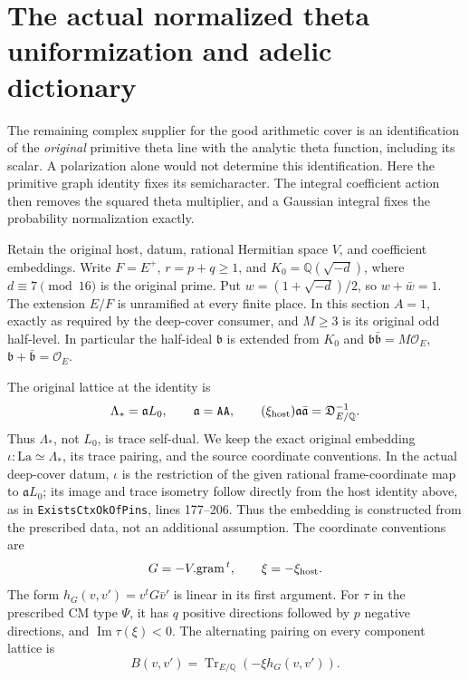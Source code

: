 \section{The actual normalized theta uniformization and adelic dictionary}
\label{sec:actual-normalized-member}

The remaining complex supplier for the good arithmetic cover is an
identification of the \emph{original} primitive theta line with the
analytic theta function, including its scalar.  A polarization alone
would not determine this identification.  Here the primitive graph
identity fixes its semicharacter.  The integral coefficient action
then removes the squared theta multiplier, and a Gaussian integral
fixes the probability normalization exactly.

Retain the original host, datum, rational Hermitian space $V$, and
coefficient embeddings.  Write $F=E^+$, $r=p+q\ge1$, and
$K_0=\mathbb Q(\sqrt{-d})$, where $d\equiv7\pmod {16}$ is the
original prime.  Put $w=(1+\sqrt{-d})/2$, so $w+\bar w=1$.
The extension $E/F$ is unramified at every finite place.  In this
section $A=1$, exactly as required by the deep-cover consumer, and
$M\ge3$ is its original odd half-level.  In particular the half-ideal
$\mathfrak b$ is extended from $K_0$ and
$\mathfrak b\bar{\mathfrak b}=M\mathcal O_E$,
$\mathfrak b+\bar{\mathfrak b}=\mathcal O_E$.

The original lattice at the identity is
\begin{equation}\label{eq:member-original-lattice}
 \Lambda_*=\mathfrak a L_0,\qquad
 \mathfrak a=\texttt{AA},\qquad
 (\xi_{\rm host})\mathfrak a\bar{\mathfrak a}
                       =\mathfrak D_{E/\mathbb Q}^{-1}.
\end{equation}
Thus $\Lambda_*$, not $L_0$, is trace self-dual.  We keep the exact
original embedding $\iota:\mathrm{La}\simeq\Lambda_*$, its trace
pairing, and the source coordinate conventions.  In the actual
deep-cover datum, $\iota$ is the restriction of the given rational
frame-coordinate map to $\mathfrak a L_0$; its image and trace
isometry follow directly from the host identity above, as in
\texttt{ExistsCtxOkOfPins}, lines 177--206.  Thus the embedding is
constructed from the prescribed data, not an additional assumption.
The coordinate conventions are
\[
                 G=-V.\mathrm{gram}^{\,t},
                 \qquad \xi=-\xi_{\rm host}.
\]
The form $h_G(v,v')=v^tG\bar v'$ is linear in its first argument.
For $\tau$ in the prescribed CM type $\Psi$, it has $q$ positive
directions followed by $p$ negative directions, and
$\operatorname{Im}\tau(\xi)<0$.  The alternating pairing on every
component lattice is
\[
                 B(v,v')=\operatorname{Tr}_{E/\mathbb Q}
                                      (-\xi h_G(v,v')).
\]

